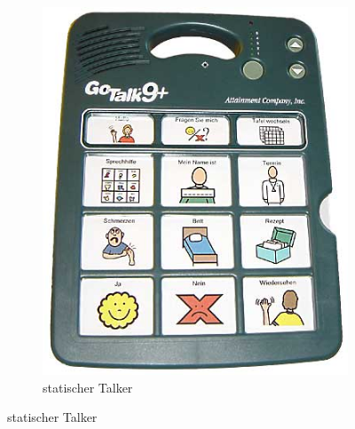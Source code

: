             \begin{figure}[H]
				\centering
				\begin{subfigure}{.3\textwidth}
  					\centering
  					\includegraphics[width=.8\linewidth]{images/goTalkPlus.jpg}
  					\caption{statischer Talker \parencite{rehavista:goTalkPlus}}
                    

\end{subfigure}
\end{figure}
